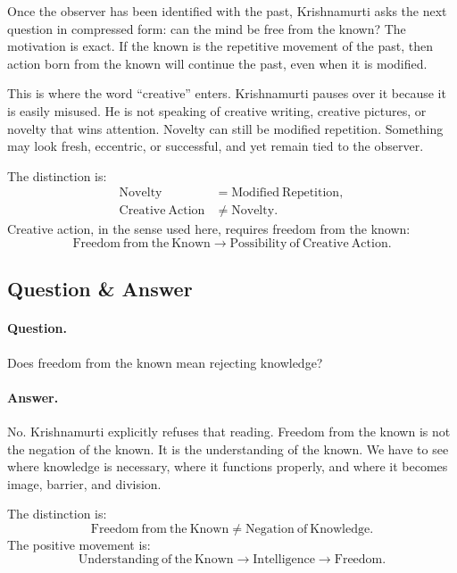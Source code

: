 Once the observer has been identified with the past, Krishnamurti asks the next question in compressed form: can the mind be free from the known? The motivation is exact. If the known is the repetitive movement of the past, then action born from the known will continue the past, even when it is modified.

This is where the word ``creative'' enters. Krishnamurti pauses over it because it is easily misused. He is not speaking of creative writing, creative pictures, or novelty that wins attention. Novelty can still be modified repetition. Something may look fresh, eccentric, or successful, and yet remain tied to the observer.

The distinction is:
\begin{align}
\mathrm{Novelty} &= \mathrm{Modified\ Repetition},\\
\mathrm{Creative\ Action} &\neq \mathrm{Novelty}.
\end{align}
Creative action, in the sense used here, requires freedom from the known:
\begin{equation}
\mathrm{Freedom\ from\ the\ Known}
\longrightarrow
\mathrm{Possibility\ of\ Creative\ Action}.
\end{equation}

\subsection{Question \& Answer}

\paragraph{Question.}
Does freedom from the known mean rejecting knowledge?

\paragraph{Answer.}
No. Krishnamurti explicitly refuses that reading. Freedom from the known is not the negation of the known. It is the understanding of the known. We have to see where knowledge is necessary, where it functions properly, and where it becomes image, barrier, and division.

The distinction is:
\begin{equation}
\mathrm{Freedom\ from\ the\ Known}
\neq
\mathrm{Negation\ of\ Knowledge}.
\end{equation}
The positive movement is:
\begin{equation}
\mathrm{Understanding\ of\ the\ Known}
\longrightarrow
\mathrm{Intelligence}
\longrightarrow
\mathrm{Freedom}.
\end{equation}

